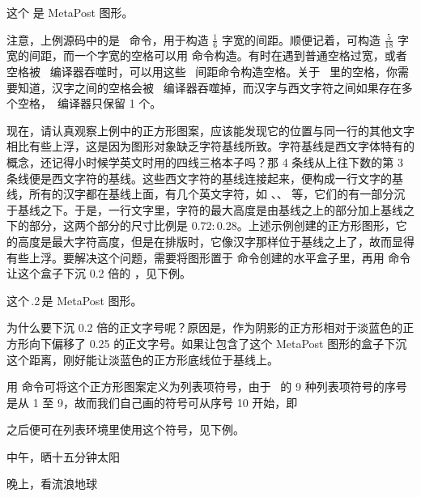 \startexample
这个\,\,是
MetaPost 图形。
\stopexample
{}

注意，上例源码中的\boxquote{\tex{,}}是 \TEX\ 命令，用于构造 $\frac{1}{6}$ 字宽的间距。顺便记着，\boxquote{\tex{;}}可构造 $\frac{5}{18}$ 字宽的间距，而一个字宽的空格可以用  命令构造。有时在遇到普通空格过宽，或者空格被 \CONTEXT\ 编译器吞噬时，可以用这些 \TEX\ 间距命令构造空格。关于 \CONTEXT\ 里的空格，你需要知道，汉字之间的空格会被 \CONTEXT\ 编译器吞噬掉，而汉字与西文字符之间如果存在多个空格，\CONTEXT\ 编译器只保留 1 个。

现在，请认真观察上例中的正方形图案，应该能发现它的位置与同一行的其他文字相比有些上浮，这是因为图形对象缺乏字符基线所致。字符基线是西文字体特有的概念，还记得小时候学英文时用的四线三格本子吗？那 4 条线从上往下数的第 3 条线便是西文字符的基线。这些西文字符的基线连接起来，便构成一行文字的基线，所有的汉字都在基线上面，有几个英文字符，如 、、 等，它们的有一部分沉于基线之下。于是，一行文字里，字符的最大高度是由基线之上的部分加上基线之下的部分，这两个部分的尺寸比例是 $0.72:0.28$。上述示例创建的正方形图形，它的高度是最大字符高度，但是在排版时，它像汉字那样位于基线之上了，故而显得有些上浮。要解决这个问题，需要将图形置于  命令创建的水平盒子里，再用  命令让这个盒子下沉 0.2 倍的 ，见下例。

\startTEX
这个\,\lower.2\bodyfontsize\hbox{}\,是 MetaPost 图形。
\stopTEX
{}

\noindent 为什么要下沉 0.2 倍的正文字号呢？原因是，作为阴影的正方形相对于淡蓝色的正方形向下偏移了 0.25 的正文字号。如果让包含了这个 MetaPost 图形的盒子下沉这个距离，刚好能让淡蓝色的正方形底线位于基线上。

用  命令可将这个正方形图案定义为列表项符号，由于 \CONTEXT\ 的 9 种列表项符号的序号是从 1 至 9，故而我们自己画的符号可从序号 10 开始，即

\startTEX
{}
\stopTEX

\noindent 之后便可在列表环境里使用这个符号，见下例。

\startexample
\startitemize[10,nowhite]
\item 中午，晒十五分钟太阳
\item 晚上，看流浪地球 
\stopitemize
\stopexample
{}

